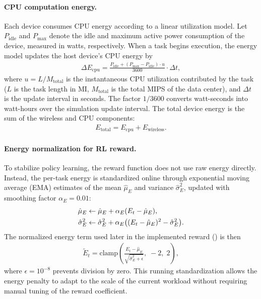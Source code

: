 \paragraph{CPU computation energy.}
Each device consumes CPU energy according to a linear utilization model. Let \(P_{\mathrm{idle}}\) and \(P_{\mathrm{max}}\) denote the idle and maximum active power consumption of the device, measured in watts, respectively. When a task begins execution, the energy model updates the host device's CPU energy by
\begin{align}
\Delta E_{\mathrm{cpu}} = \frac{P_{\mathrm{idle}} + (P_{\mathrm{max}} - P_{\mathrm{idle}}) \cdot u}{3600} \cdot \Delta t,
\label{eq:energy-cpu}
\end{align}
where \(u = L / M_{\mathrm{total}}\) is the instantaneous CPU utilization contributed by the task (\(L\) is the task length in MI, \(M_{\mathrm{total}}\) is the total MIPS of the data center), and \(\Delta t\) is the update interval in seconds. The factor \(1/3600\) converts watt-seconds into watt-hours over the simulation update interval. The total device energy is the sum of the wireless and CPU components:
\begin{align}
E_{\mathrm{total}} = E_{\mathrm{cpu}} + E_{\mathrm{wireless}}.
\label{eq:energy-total}
\end{align}

\paragraph{Energy normalization for RL reward.}
To stabilize policy learning, the reward function does not use raw energy directly. Instead, the per-task energy is standardized online through exponential moving average (EMA) estimates of the mean \(\hat{\mu}_E\) and variance \(\hat{\sigma}_E^2\), updated with smoothing factor \(\alpha_E = 0.01\):
\begin{align}
\hat{\mu}_E &\leftarrow \hat{\mu}_E + \alpha_E (E_t - \hat{\mu}_E), \notag \\
\hat{\sigma}_E^2 &\leftarrow \hat{\sigma}_E^2 + \alpha_E \bigl((E_t - \hat{\mu}_E)^2 - \hat{\sigma}_E^2\bigr).
\label{eq:energy-ema}
\end{align}
The normalized energy term used later in the implemented reward () is then
\begin{align}
\widetilde{E}_t = \mathrm{clamp}\!\left(\frac{E_t - \hat{\mu}_E}{\sqrt{\hat{\sigma}_E^2 + \epsilon}},\; -2,\; 2\right),
\label{eq:energy-norm}
\end{align}
where \(\epsilon = 10^{-8}\) prevents division by zero. This running standardization allows the energy penalty to adapt to the scale of the current workload without requiring manual tuning of the reward coefficient.

